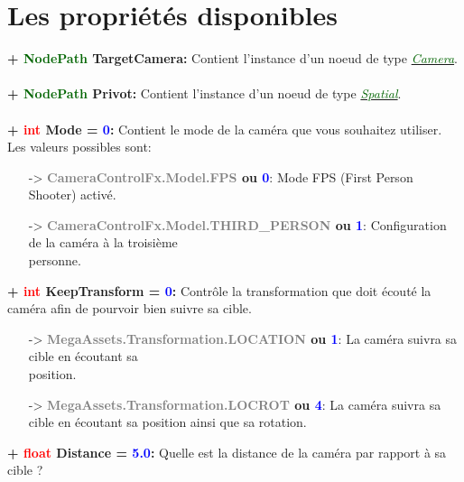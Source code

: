\documentclass[a4paper, 11pt]{article}
\begin{document}
	\section{Les propriétés disponibles}
	\textbf{+ \textcolor{darkgreen}{NodePath} TargetCamera:} Contient l'instance d'un noeud de type 
	\href{https://docs.godotengine.org/en/stable/classes/class_camera.html}
	{\textit{\textcolor{darkgreen}{Camera}}}.\\\\
	\textbf{+ \textcolor{darkgreen}{NodePath} Privot:} Contient l'instance d'un noeud de type 
	\href{https://docs.godotengine.org/en/stable/classes/class_spatial.html}
	{\textit{\textcolor{darkgreen}{Spatial}}}.\\\\
	\textbf{+ \textcolor{red}{int} Mode = \textcolor{blue}{0}:} Contient le mode de la caméra que vous 
	souhaitez utiliser. Les valeurs possibles sont:
	\begin{itemize}
		\item [-> \textbf{\textcolor{gray}{CameraControlFx.Model.FPS} ou \textcolor{blue}{0}}:] Mode FPS 
		(First Person Shooter) activé.
		\item [-> \textbf{\textcolor{gray}{CameraControlFx.Model.THIRD\_PERSON} ou \textcolor{blue}{1}}:] 
		Configuration de la caméra à la troisième \\personne.\\
	\end{itemize}
	\textbf{+ \textcolor{red}{int} KeepTransform = \textcolor{blue}{0}:} Contrôle la transformation que doit
	écouté la caméra afin de pourvoir bien suivre sa cible.
	\begin{itemize}
		\item [-> \textbf{\textcolor{gray}{MegaAssets.Transformation.LOCATION} ou \textcolor{blue}{1}}:] La 
		caméra suivra sa cible en écoutant sa \\position.
		\item [-> \textbf{\textcolor{gray}{MegaAssets.Transformation.LOCROT} ou \textcolor{blue}{4}}:] La 
		caméra suivra sa cible en écoutant sa position ainsi que sa rotation.\\
	\end{itemize}
	\textbf{+ \textcolor{red}{float} Distance = \textcolor{blue}{5.0}:} Quelle est la distance de la caméra 
	par rapport à sa cible ?\\\\
\end{document}

